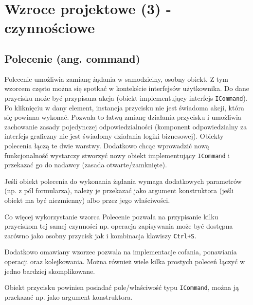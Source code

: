 \section{Wzroce projektowe (3) - czynnościowe }
\subsection{Polecenie (ang. command)}
Polecenie umożliwia zamianę żądania w samodzielny, osobny obiekt. Z tym wzorcem często można się spotkać w kontekście interfejsów użytkownika. Do dane przycisku może być przypisana akcja (obiekt implementujący interfejs \texttt{ICommand}).  Po kliknięciu w dany element, instancja przycisku nie jest świadoma akcji, która się powinna wykonać. Pozwala to łatwą zmianę działania przycisku i umożliwia zachowanie zasady pojedynczej odpowiedzialności (komponent odpowiedzialny za interfejs graficzny nie jest świadomy działania logiki biznesowej). Obiekty polecenia łączą te dwie warstwy. Dodatkowo chcąc wprowadzić nową funkcjonalność wystarczy stworzyć nowy obiekt implementujący \texttt{ICommand} i przekazać go do nadawcy (zasada otwarte/zamknięte).

Jeśli obiekt polecenia do wykonania żądania wymaga dodatkowych parametrów (np. z pól formularza), należy je przekazać jako argument konstruktora (jeśli obiekt ma być niezmienny) albo przez jego właściwości.

Co więcej wykorzystanie wzorca Polecenie pozwala na przypisanie kilku przyciskom tej samej czynności np. operacja zapisywania może być dostępna zarówno jako osobny przycisk jak i kombinacja klawiszy \texttt{Ctrl+S}.

Dodatkowo omawiany wzorzec pozwala na implementacje cofania, ponawiania operacji oraz kolejkowania. Można również wiele kilka prostych poleceń łączyć w jedno bardziej skomplikowane.

Obiekt przycisku powinien posiadać pole/właściwość typu \texttt{ICommand}, można ją przekazać np. jako argument konstruktora. 







